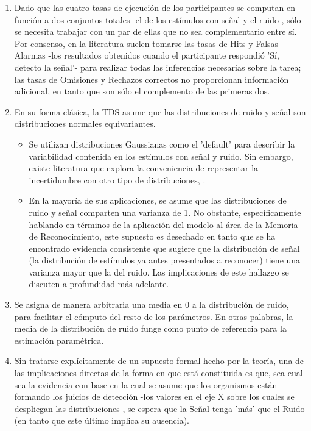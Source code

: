 \begin{enumerate}

\item  Dado que las cuatro tasas de ejecución de los participantes se computan en función a dos conjuntos totales -el de los estímulos con señal y el ruido-, sólo se necesita trabajar con un par de ellas que no sea complementario entre sí. Por consenso, en la literatura suelen tomarse las tasas de Hits y Falsas Alarmas -los resultados obtenidos cuando el participante respondió 'Sí, detecto la señal'- para realizar todas las inferencias necesarias sobre la tarea; las tasas de Omisiones y Rechazos correctos no proporcionan información adicional, en tanto que son sólo el complemento de las primeras dos.\\

\item En su forma clásica, la TDS asume que las distribuciones de ruido y señal son distribuciones normales equivariantes.\\
  \begin{itemize}
  \item Se utilizan distribuciones Gaussianas como el 'default' para describir la variabilidad contenida en los estímulos con señal y ruido. Sin embargo, existe literatura que explora la conveniencia de representar la incertidumbre con otro tipo de distribuciones, \parencite{WeijiMa2010}.\\
  \item En la mayoría de sus aplicaciones, se asume que las distribuciones de ruido y señal comparten una varianza de 1. No obstante, específicamente hablando en términos de la aplicación del modelo al área de la Memoria de Reconocimiento, este supuesto es desechado en tanto que se ha encontrado evidencia consistente que sugiere que la distribución de señal (la distribución de estímulos ya antes presentados a reconocer) tiene una varianza mayor que la del ruido. Las implicaciones de este hallazgo se discuten a profundidad más adelante.\\
  \end{itemize}
\item Se asigna de manera arbitraria una media en 0 a la distribución de ruido, para facilitar el cómputo del resto de los parámetros. En otras palabras, la media de la distribución de ruido funge como punto de referencia para la estimación paramétrica.\\
\item Sin tratarse explícitamente de un supuesto formal hecho por la teoría, una de las implicaciones directas de la forma en que está constituida es que, sea cual sea la evidencia con base en la cual se asume que los organismos están formando los juicios de detección -los valores en el eje X sobre los cuales se despliegan las distribuciones-, se espera que la Señal tenga 'más' que el Ruido (en tanto que este último implica su ausencia).\\

\end{enumerate}
